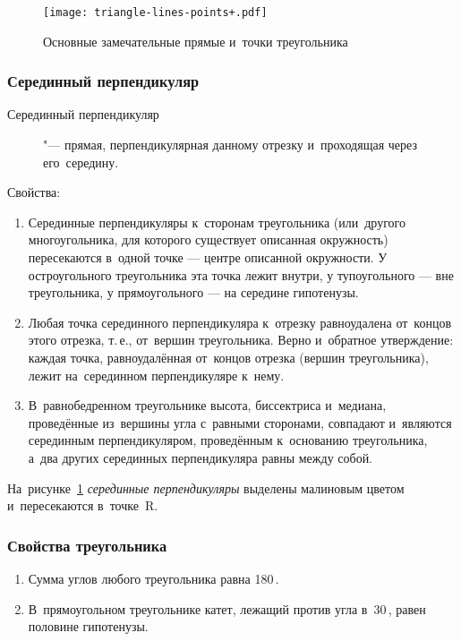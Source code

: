 \documentclass[]{scrartcl}
\begin{document}
\begin{figure}[ht]
	\centering %
	\texttt{[image: triangle-lines-points+.pdf]}
	\caption{Основные замечательные прямые и~точки треугольника}\label{fig:triangle-lines-points}
\end{figure} 

\subsubsection{Серединный перпендикуляр}
\begin{description}
	\item[Серединный перпендикуляр] "---  прямая, перпендикулярная данному отрезку и~проходящая через его~середину.
\end{description}
Свойства:
\begin{enumerate}
	\item Серединные перпендикуляры к~сторонам треугольника (или~другого многоугольника, для которого существует описанная окружность) пересекаются в~одной точке — центре описанной окружности. У остроугольного треугольника эта точка лежит внутри, у тупоугольного — вне треугольника, у прямоугольного — на середине гипотенузы.
	\item Любая точка серединного перпендикуляра к~отрезку равноудалена от~концов этого отрезка, т.\,е., от~вершин треугольника. Верно и~обратное утверждение: каждая точка, равноудалённая от~концов отрезка (вершин треугольника), лежит на~серединном перпендикуляре к~нему.
	\item В~равнобедренном треугольнике высота, биссектриса и~медиана, проведённые из~вершины угла с~равными сторонами, совпадают и~являются серединным перпендикуляром, проведённым к~основанию треугольника, а~два других серединных перпендикуляра равны между собой.	
\end{enumerate}
На~рисунке~\ref{fig:triangle-lines-points} \emph{серединные перпендикуляры} выделены малиновым цветом и~пересекаются в~точке~R.
\subsubsection{Свойства треугольника}
\begin{enumerate}
	\item Сумма углов любого треугольника равна 180\,\textdegree.
	\item В~прямоугольном треугольнике катет, лежащий против угла в~30\,\textdegree, равен половине гипотенузы.
\end{enumerate}
\end{document}
